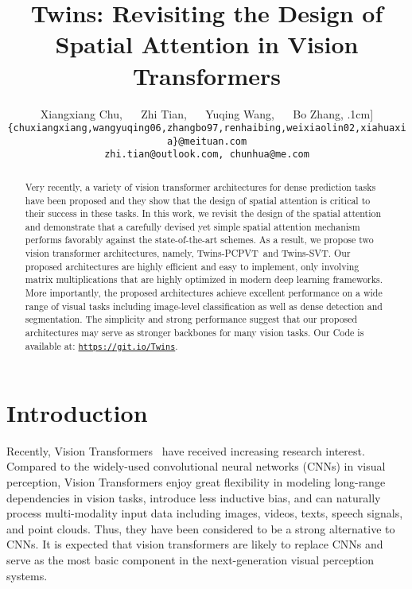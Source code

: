 \documentclass{article}
\title{Twins: Revisiting the Design of Spatial Attention in Vision Transformers}
\author{
Xiangxiang Chu, 
~~
Zhi Tian,  
~~
Yuqing Wang, 
~~ 
Bo Zhang, \0.1cm]
{ \tt\small \{chuxiangxiang,wangyuqing06,zhangbo97,renhaibing,weixiaolin02,xiahuaxia\}@meituan.com}\\
{ \tt\small zhi.tian@outlook.com, chunhua@me.com} 
}
\def \altour   {Twins-SVT}
\def \pcpvt  {Twins-PCPVT}
\begin{document}
\maketitle

\begin{abstract}
    Very 
    recently, a variety of vision transformer architectures for dense prediction tasks have been proposed and they show 
    that 
    the 
    design of spatial attention is critical 
    to their success in these tasks. In this work, we revisit 
    the 
    design of the spatial attention and demonstrate 
    that a carefully devised yet simple spatial attention
    mechanism  
    performs favorably against the state-of-the-art schemes. As a result, we propose two vision transformer architectures, namely,
\pcpvt\ and \altour. Our proposed architectures are highly
    efficient and easy to implement, only involving matrix multiplications that are highly optimized in modern deep learning frameworks. More importantly, the proposed architectures achieve 
    excellent performance on a wide range of visual tasks including image-level classification as well as dense detection and segmentation. The simplicity and strong 
    performance suggest that our proposed architectures may 
    serve as stronger backbones for  many vision 
    tasks. Our
Code is available 
    at: \href{https://github.com/Meituan-AutoML/Twins}{\texttt{https://git.io/Twins}}.


\end{abstract}



\section{Introduction}

Recently, Vision Transformers~\cite{dosovitskiy2021an, touvron2020training, carion2020end} have received increasing research interest. Compared to the widely-used convolutional neural networks (CNNs) in visual perception, Vision Transformers enjoy great flexibility in modeling 
 long-range  dependencies
in 
vision tasks, introduce less inductive bias,  and can 
naturally process 
multi-modality input 
data including 
images, videos, texts, speech signals, and point clouds. Thus, they have been considered to be a strong alternative to CNNs.
It is expected that vision transformers are likely to replace CNNs and 
serve as the most basic component in the next-generation visual perception systems.
\end{document}
